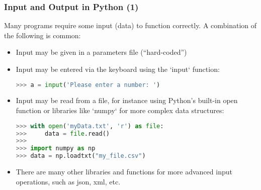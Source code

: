 
\begin{frame}[fragile]
  \frametitle{Input and Output in Python (1)}
  Many programs require some input (data) to function correctly. A combination of the following is common:
  \begin{itemize}[<+->]
    \item Input may be given in a parameters file (``hard-coded'')
    \item Input may be entered via the keyboard using the `input` function:
    \begin{lstlisting}[language=Python,numbers=none]
>>> a = input('Please enter a number: ')
    \end{lstlisting}
    \item Input may be read from a file, for instance using Python's built-in open function or libraries like `numpy` for more complex data structures:
    \begin{lstlisting}[language=Python,numbers=none]
>>> with open('myData.txt', 'r') as file:
>>>     data = file.read()
>>> 
>>> import numpy as np
>>> data = np.loadtxt("my_file.csv")
    \end{lstlisting}
    \item There are many other libraries and functions for more advanced input operations, such as json, xml, etc.
  \end{itemize}
 \end{frame}

